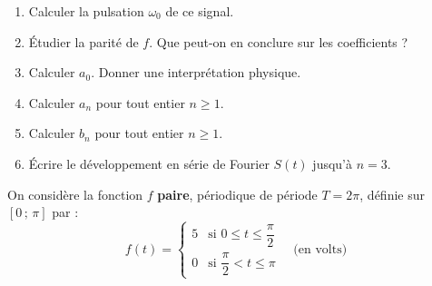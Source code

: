 \documentclass[a4paper,11pt]{article}
\begin{document}
\begin{enumerate}[label=\textbf{\arabic*.}]
  \item Calculer la pulsation $\omega_0$ de ce signal.
  \begin{tcolorbox}[reponsebox, height=1cm]\end{tcolorbox}

  \item Étudier la parité de $f$. Que peut-on en conclure sur les coefficients ?
  \begin{tcolorbox}[reponsebox, height=2cm]\end{tcolorbox}

  \item Calculer $a_0$. Donner une interprétation physique.
  \begin{tcolorbox}[reponsebox, height=1cm]\end{tcolorbox}

  \item Calculer $a_n$ pour tout entier $n \geq 1$.
  \begin{tcolorbox}[reponsebox, height=3.5cm]\end{tcolorbox}

  \item Calculer $b_n$ pour tout entier $n \geq 1$.
  \begin{tcolorbox}[reponsebox, height=4.5cm]\end{tcolorbox}

  \item Écrire le développement en série de Fourier $S(t)$ jusqu'à $n = 3$.
  \begin{tcolorbox}[reponsebox, height=2cm]\end{tcolorbox}
\end{enumerate}

\newpage

\begin{tcolorbox}[exobox={Exercice 2 — Parité et Parseval}]
On considère la fonction $f$ \textbf{paire}, périodique de période $T = 2\pi$, définie sur $[0\,;\,\pi]$ par :
\[
  f(t) = \begin{cases} 5 & \text{si } 0 \leq t \leq \dfrac{\pi}{2} \\[4pt] 0 & \text{si } \dfrac{\pi}{2} < t \leq \pi \end{cases}
  \quad \text{(en volts)}
\]
\end{tcolorbox}
\end{document}
